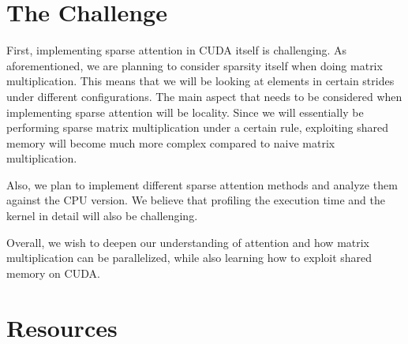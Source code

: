 \documentclass[11pt]{article}
\begin{document}


\section{The Challenge}
First, implementing sparse attention in CUDA itself is challenging. As aforementioned, we are planning to consider sparsity itself when doing matrix multiplication. This means that we will be looking at elements in certain strides under different configurations. The main aspect that needs to be considered when implementing sparse attention will be locality. Since we will essentially be performing sparse matrix multiplication under a certain rule, exploiting shared memory will become much more complex compared to naive matrix multiplication.

Also, we plan to implement different sparse attention methods and analyze them against the CPU version. We believe that profiling the execution time and the kernel in detail will also be challenging.

Overall, we wish to deepen our understanding of attention and how matrix multiplication can be parallelized, while also learning how to exploit shared memory on CUDA.





\section{Resources}
\end{document}
